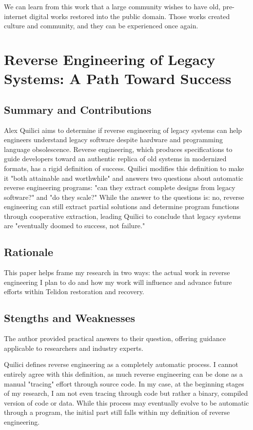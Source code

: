 \documentclass[sigconf]{acmart}
\begin{document}
We can learn from this work that a large community wishes to have old, pre-internet digital works restored into the public domain. Those works created culture and community, and they can be experienced once again.

\section{Reverse Engineering of Legacy Systems: A Path Toward Success}


\subsection{Summary and Contributions}

Alex Quilici aims to determine if reverse engineering of legacy systems can help engineers understand legacy software despite hardware and programming language obsolescence. Reverse engineering, which produces specifications to guide developers toward an authentic replica of old systems in modernized formats, has a rigid definition of success. Quilici modifies this definition to make it "both attainable and worthwhile" and answers two questions about automatic reverse engineering programs: "can they extract complete designs from legacy software?" and "do they scale?" While the answer to the questions is: no, reverse engineering can still extract partial solutions and determine program functions through cooperative extraction, leading Quilici to conclude that legacy systems are "eventually doomed to success, not failure."

\subsection{Rationale}

This paper helps frame my research in two ways: the actual work in reverse engineering I plan to do and how my work will influence and advance future efforts within Telidon restoration and recovery.  

\subsection{Stengths and Weaknesses}

The author provided practical answers to their question, offering guidance applicable to researchers and industry experts.

Quilici defines reverse engineering as a completely automatic process. I cannot entirely agree with this definition, as much reverse engineering can be done as a manual "tracing" effort through source code. In my case, at the beginning stages of my research, I am not even tracing through code but rather a binary, compiled version of code or data. While this process may eventually evolve to be automatic through a program, the initial part still falls within my definition of reverse engineering.
\end{document}
